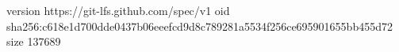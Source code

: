 version https://git-lfs.github.com/spec/v1
oid sha256:c618e1d700dde0437b06eeefcd9d8c789281a5534f256ce695901655bb455d72
size 137689
